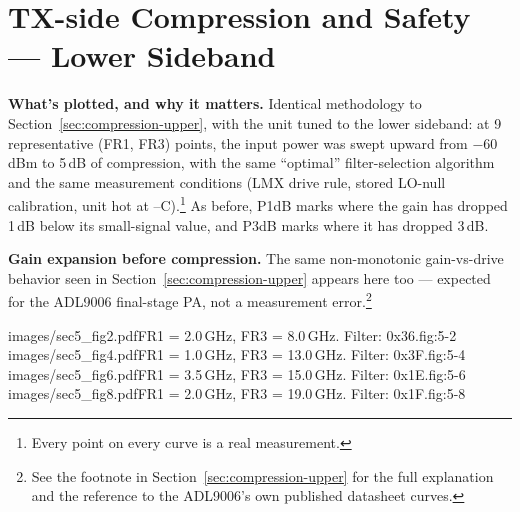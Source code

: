\clearpage
\section{TX-side Compression and Safety --- Lower Sideband}
\label{sec:compression-lower}

\textbf{What's plotted, and why it matters.} Identical methodology to
Section~\ref{sec:compression-upper}, with the unit tuned to the lower sideband: at 9 representative (FR1, FR3)
points, the input power was swept upward from −60\,dBm to 5\,dB of compression, with the same ``optimal'' filter-selection
algorithm and the same measurement conditions (LMX drive rule, stored LO-null calibration, unit hot at
\condCompMinC--\condCompMaxC\textdegree C).\footnote{Every point on every curve is a real measurement.} As
before, P1dB marks where the gain has dropped 1\,dB below its small-signal value, and P3dB marks where it has
dropped 3\,dB.

\textbf{Gain expansion before compression.} The same non-monotonic gain-vs-drive behavior seen in
Section~\ref{sec:compression-upper} appears here too --- expected for the ADL9006 final-stage PA, not a
measurement error.\footnote{See the footnote in Section~\ref{sec:compression-upper} for the full
explanation and the reference to the ADL9006's own published datasheet curves.}

%
        {images/sec5_fig2.pdf}{FR1 = 2.0\,GHz, FR3 = 8.0\,GHz. Filter: 0x36.}{fig:5-2}
%
        {images/sec5_fig4.pdf}{FR1 = 1.0\,GHz, FR3 = 13.0\,GHz. Filter: 0x3F.}{fig:5-4}
%
        {images/sec5_fig6.pdf}{FR1 = 3.5\,GHz, FR3 = 15.0\,GHz. Filter: 0x1E.}{fig:5-6}
%
        {images/sec5_fig8.pdf}{FR1 = 2.0\,GHz, FR3 = 19.0\,GHz. Filter: 0x1F.}{fig:5-8}
